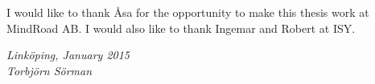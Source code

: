 \begin{acknowledgments}%
	I would like to thank Åsa for the opportunity to make this thesis work at MindRoad AB. I would also like to thank Ingemar and Robert at ISY.
	
	\addvspace{1em}%
	\begin{flushright}%
    \textit{%
		Linköping, January 2015 \\%
		Torbjörn Sörman%
	}%
	\end{flushright}%
\end{acknowledgments}%
